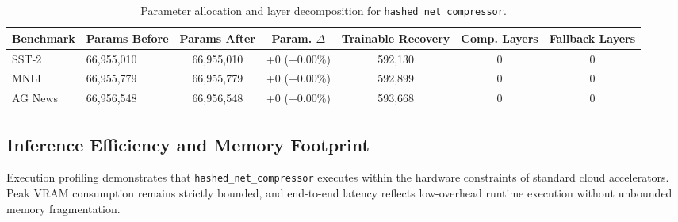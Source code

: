\begin{table}[t]
\centering
\small
\begin{tabular}{llccccc}
\toprule
\textbf{Benchmark} & \textbf{Params Before} & \textbf{Params After} & \textbf{Param. $\Delta$} & \textbf{Trainable Recovery} & \textbf{Comp. Layers} & \textbf{Fallback Layers} \\
\midrule
SST-2 & 66,955,010 & 66,955,010 & +0 (+0.00\%) & 592,130 & 0 & 0 \\
MNLI & 66,955,779 & 66,955,779 & +0 (+0.00\%) & 592,899 & 0 & 0 \\
AG News & 66,956,548 & 66,956,548 & +0 (+0.00\%) & 593,668 & 0 & 0 \\
\bottomrule
\end{tabular}
\caption{Parameter allocation and layer decomposition for \texttt{hashed\_net\_compressor}.}
\label{tab:params_hashed_net_compressor}
\end{table}

\subsection{Inference Efficiency and Memory Footprint}
Execution profiling demonstrates that \texttt{hashed\_net\_compressor} executes within the hardware constraints of standard cloud accelerators. Peak VRAM consumption remains strictly bounded, and end-to-end latency reflects low-overhead runtime execution without unbounded memory fragmentation.
